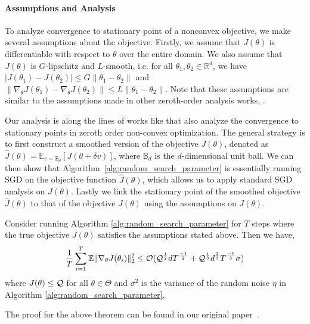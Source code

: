 \paragraph{Assumptions and Analysis}
\label{sec:assumptions_parameter}

To analyze convergence to stationary point of a nonconvex objective, we make several assumptions about the objective. Firstly, we assume that $J(\theta)$ is differentiable with respect to $\theta$ over the entire domain. We also assume that $J(\theta)$ is $G$-lipschitz and $L$-smooth, i.e. for all $\theta_1, \theta_2 \in \mathbb{R}^d$, we have $|J(\theta_1) - J(\theta_2)| \leq G\|\theta_1 - \theta_2\|$ and $\|\nabla_\theta J(\theta_1) - \nabla_\theta J(\theta_2)\|\leq L\|\theta_1 - \theta_2\|$. 
%
Note that these assumptions are similar to the assumptions made in other zeroth-order analysis works, \citep{flaxman2005online, agarwal2010optimal, duchi2015optimal, shamir2013complexity, ghadimi2013stochastic, nesterov2017random}.

%
%

Our analysis is along the lines of works like \citep{ghadimi2013stochastic,
  nesterov2017random} that also analyze the convergence to stationary points in
zeroth order non-convex optimization. The general strategy is to first construct a smoothed version of the objective $J(\theta)$, denoted as $\hat{J}(\theta) = \mathbb{E}_{v\sim \mathbb{B}_{d}}[J(\theta+\delta v)]$, where $\mathbb{B}_d$ is the $d$-dimensional unit ball. We can then show that Algorithm~\ref{alg:random_search_parameter} is essentially running SGD on the objective function $\hat{J}(\theta)$, which allows us to apply standard SGD analysis on $\hat{J}(\theta)$. Lastly we link the stationary point of the smoothed objective $\hat{J}(\theta)$ to that of the objective $J(\theta)$ using the assumptions on ${J}(\theta)$.

\begin{theorem}
  \label{theorem:parameter-convergence}
  Consider running Algorithm \ref{alg:random_search_parameter} for $T$
  steps where the true objective $J(\theta)$ satisfies the assumptions stated above.
  Then we have,
  \begin{equation}
    \label{eq:parameter-convergence}
    \frac{1}{T}\sum_{i=1}^T \mathbb{E}\|\nabla_\theta
    J(\theta_i)\|_2^2 \leq \mathcal{O}(\mathcal{Q}^{\frac{1}{2}}dT^{\frac{-1}{2}} + \mathcal{Q}^{\frac{1}{3}}d^{\frac{2}{3}}T^{\frac{-1}{3}}\sigma)
  \end{equation}
  where $J(\theta)\leq \mathcal{Q}$ for all $\theta \in \Theta$ and $\sigma^2$ is the variance of the random noise $\eta$ in Algorithm \ref{alg:random_search_parameter}.
\end{theorem}
The proof for the above theorem can be found in our original
paper~\cite{aistats19}.

